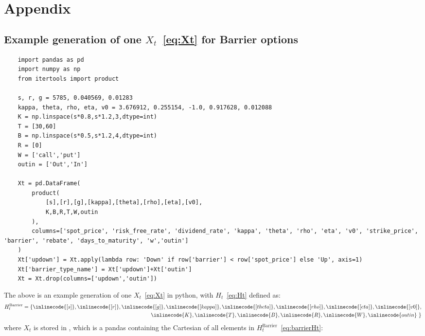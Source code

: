 \appendix
\section{Appendix}
\subsection{Example generation of one $X_{t}$~\eqref{eq:Xt} for Barrier options}
\begin{table}[ht]
	\centering
	\begin{lstlisting}
	import pandas as pd
	import numpy as np
	from itertools import product
	
	s, r, g = 5785, 0.040569, 0.01283
	kappa, theta, rho, eta, v0 = 3.676912, 0.255154, -1.0, 0.917628, 0.012088
	K = np.linspace(s*0.8,s*1.2,3,dtype=int)
	T = [30,60]
	B = np.linspace(s*0.5,s*1.2,4,dtype=int)
	R = [0]
	W = ['call','put']
	outin = ['Out','In']
	
	Xt = pd.DataFrame(
		product(
			[s],[r],[g],[kappa],[theta],[rho],[eta],[v0],
			K,B,R,T,W,outin
		),
		columns=['spot_price', 'risk_free_rate', 'dividend_rate', 'kappa', 'theta', 'rho', 'eta', 'v0', 'strike_price', 'barrier', 'rebate', 'days_to_maturity', 'w','outin']
	)
	Xt['updown'] = Xt.apply(lambda row: 'Down' if row['barrier'] < row['spot_price'] else 'Up', axis=1)
	Xt['barrier_type_name'] = Xt['updown']+Xt['outin']
	Xt = Xt.drop(columns=['updown','outin'])
	\end{lstlisting}
\end{table}
The above is an example generation of one $X_{t}$~\eqref{eq:Xt} in python, with $H_{t}$~\eqref{eq:Ht} defined as:
\begin{equation}
	\begin{aligned}
	H_{t}^{\text{Barrier}} = \{ \inlinecode{[s]}, \inlinecode{[r]}, \inlinecode{[g]}, \inlinecode{[kappa]}, \inlinecode{[theta]}, \inlinecode{[rho]}, \inlinecode{[eta]}, \inlinecode{[v0]}, \\ \inlinecode{K},  \inlinecode{T}, \inlinecode{B}, \inlinecode{R}, \inlinecode{W}, \inlinecode{outin}\ \}
	\label{eq:barrierHt}
	\end{aligned}
\end{equation}
where $X_{t}$ is stored in , which is a pandas  containing the Cartesian  of all elements in $H_{t}^{\text{Barrier}}$~\eqref{eq:barrierHt}: \\
